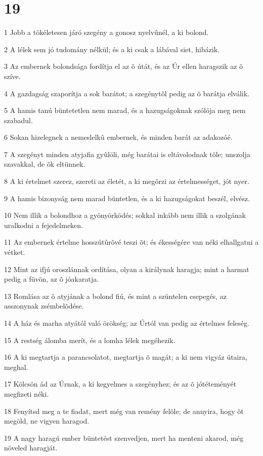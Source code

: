 \chapter{19}

\par 1 Jobb a tökéletesen járó szegény a gonosz nyelvûnél, a ki bolond.
\par 2 A lélek sem jó tudomány nélkül; és a ki csak a lábával siet, hibázik.
\par 3 Az embernek bolondsága fordítja el az õ útát, és az Úr ellen haragszik az õ szíve.
\par 4 A gazdagság szaporítja a sok barátot; a szegénytõl pedig az õ barátja elválik.
\par 5 A hamis tanú büntetetlen nem marad, és a hazugságoknak szólója meg nem szabadul.
\par 6 Sokan hizelegnek a nemeslelkû embernek, és minden barát az adakozóé.
\par 7 A szegényt minden atyjafia gyûlöli, még barátai is eltávolodnak tõle; unszolja szavakkal, de õk eltünnek.
\par 8 A ki értelmet szerez, szereti az életét, a ki megõrzi az értelmességet, jót nyer.
\par 9 A hamis bizonyság nem marad büntetlen, és a ki hazugságokat beszél, elvész.
\par 10 Nem illik a bolondhoz a gyönyörködés; sokkal inkább nem illik a szolgának uralkodni a fejedelmeken.
\par 11 Az embernek értelme hosszútûrõvé teszi õt; és ékességére van néki elhallgatni a vétket.
\par 12 Mint az ifjú oroszlánnak ordítása, olyan a királynak haragja; mint a harmat pedig a füvön, az õ  jóakaratja.
\par 13 Romlása az õ atyjának a bolond fiú, és mint a szüntelen csepegés, az asszonynak zsémbelõdése.
\par 14 A ház és marha atyától való örökség; az Úrtól van pedig az értelmes feleség.
\par 15 A restség álomba merít, és a lomha lélek  megéhezik.
\par 16 A ki megtartja a parancsolatot, megtartja õ magát; a ki nem vigyáz útaira, meghal.
\par 17 Kölcsön ád az Úrnak, a ki kegyelmes a szegényhez; és az õ jótéteményét megfizeti néki.
\par 18 Fenyítsd meg a te fiadat, mert még van remény felõle; de annyira, hogy õt megöld, ne vigyen haragod.
\par 19 A nagy haragú ember büntetést szenvedjen, mert ha menteni akarod, még növeled haragját.
